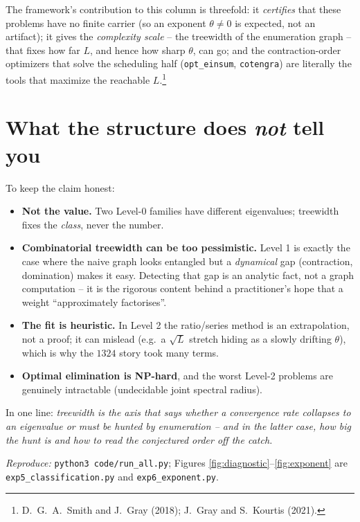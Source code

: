 \documentclass[11pt]{article}
\theoremstyle{plain}
\theoremstyle{definition}
\begin{document}
The framework's contribution to this column is threefold: it \emph{certifies}
that these problems have no finite carrier (so an exponent $\theta\neq0$ is
expected, not an artifact); it gives the \emph{complexity scale} -- the treewidth
of the enumeration graph -- that fixes how far $L$, and hence how sharp $\theta$,
can go; and the contraction-order optimizers that solve the scheduling half
(\texttt{opt\_einsum}, \texttt{cotengra}) are literally the tools that maximize
the reachable $L$.\footnote{D.~G.~A.~Smith and J.~Gray (2018); J.~Gray and
S.~Kourtis (2021).}

\section{What the structure does \emph{not} tell you}

To keep the claim honest:
\begin{itemize}[itemsep=2pt]
\item \textbf{Not the value.} Two Level-0 families have different
eigenvalues; treewidth fixes the \emph{class}, never the number.
\item \textbf{Combinatorial treewidth can be too pessimistic.} Level 1 is exactly
the case where the naive graph looks entangled but a \emph{dynamical} gap
(contraction, domination) makes it easy. Detecting that gap is an analytic fact,
not a graph computation -- it is the rigorous content behind a practitioner's
hope that a weight ``approximately factorises''.
\item \textbf{The fit is heuristic.} In Level 2 the ratio/series method is an
extrapolation, not a proof; it can mislead (e.g.\ a $\sqrt L$ stretch hiding as a
slowly drifting $\theta$), which is why the $1324$ story took many terms.
\item \textbf{Optimal elimination is NP-hard}, and the worst Level-2 problems are
genuinely intractable (undecidable joint spectral radius).
\end{itemize}

\noindent In one line: \emph{treewidth is the axis that says whether a
convergence rate collapses to an eigenvalue or must be hunted by enumeration --
and in the latter case, how big the hunt is and how to read the conjectured
order off the catch.}

\bigskip
\noindent\textit{Reproduce:} \texttt{python3 code/run\_all.py}; Figures
\ref{fig:diagnostic}--\ref{fig:exponent} are \texttt{exp5\_classification.py} and
\texttt{exp6\_exponent.py}.
\end{document}
